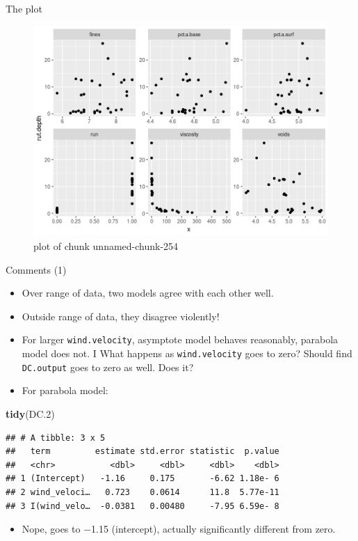 \documentclass[ignorenonframetext,]{beamer}
\newenvironment{Shaded}{\begin{snugshade}}{\end{snugshade}}
\newcommand{\FloatTok}[1]{\textcolor[rgb]{0.00,0.00,0.81}{#1}}
\newcommand{\KeywordTok}[1]{\textcolor[rgb]{0.13,0.29,0.53}{\textbf{#1}}}
\newcommand{\NormalTok}[1]{#1}
\providecommand{\tightlist}{%
  \setlength{\itemsep}{0pt}\setlength{\parskip}{0pt}}
\begin{document}
\begin{frame}{The plot}
\protect\hypertarget{the-plot-1}{}

\begin{figure}
\centering
\includegraphics{figure/unnamed-chunk-254-1.png}
\caption{plot of chunk unnamed-chunk-254}
\end{figure}

\end{frame}

\begin{frame}[fragile]{Comments (1)}
\protect\hypertarget{comments-1-1}{}

\begin{itemize}
\tightlist
\item
  Over range of data, two models agree with each other well.
\item
  Outside range of data, they disagree violently!
\item
  For larger \texttt{wind.velocity}, asymptote model behaves reasonably,
  parabola model does not. I What happens as \texttt{wind.velocity} goes
  to zero? Should find \texttt{DC.output} goes to zero as well. Does it?
\item
  For parabola model:
\end{itemize}

\begin{Shaded}
\begin{Highlighting}[]
\KeywordTok{tidy}\NormalTok{(DC}\FloatTok{.2}\NormalTok{)}
\end{Highlighting}
\end{Shaded}

\begin{verbatim}
## # A tibble: 3 x 5
##   term         estimate std.error statistic  p.value
##   <chr>           <dbl>     <dbl>     <dbl>    <dbl>
## 1 (Intercept)   -1.16     0.175       -6.62 1.18e- 6
## 2 wind_veloci…   0.723    0.0614      11.8  5.77e-11
## 3 I(wind_velo…  -0.0381   0.00480     -7.95 6.59e- 8
\end{verbatim}

\begin{itemize}
\tightlist
\item
  Nope, goes to −1.15 (intercept), actually significantly different from
  zero.
\end{itemize}

\end{frame}
\end{document}
